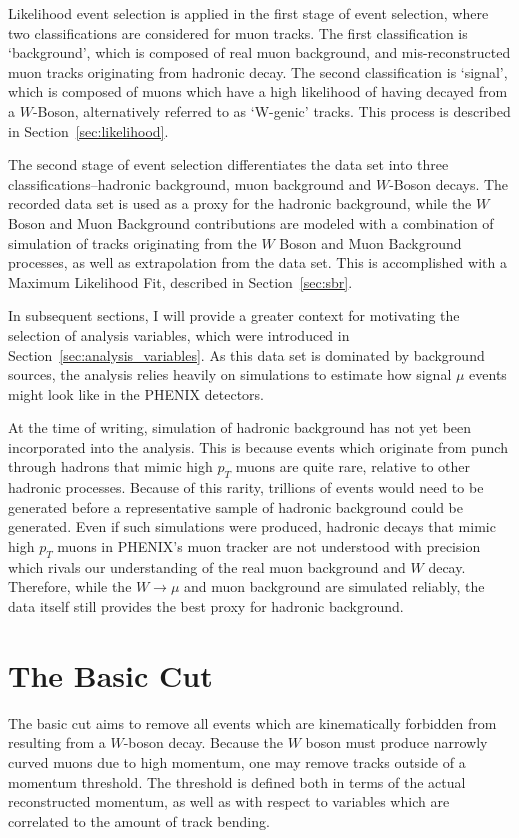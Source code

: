 Likelihood event selection is applied in the first stage of event selection,
where two classifications are considered for muon tracks. The first
classification is `background', which is composed of real muon background, and
mis-reconstructed muon tracks originating from hadronic decay. The second
classification is `signal', which is composed of muons which have a high
likelihood of having decayed from a $W$-Boson, alternatively referred to as
`W-genic' tracks. This process is described in Section~\ref{sec:likelihood}.

The second stage of event selection differentiates the data set into three
classifications--hadronic background, muon background and $W$-Boson decays.
The recorded data set is used as a proxy for the hadronic background, while the
$W$ Boson and Muon Background contributions are modeled with a combination of
simulation of tracks originating from the $W$ Boson and Muon Background
processes, as well as extrapolation from the data set. This is accomplished with
a Maximum Likelihood Fit, described in Section~\ref{sec:sbr}.

In subsequent sections, I will provide a greater context for motivating the
selection of analysis variables, which were introduced in
Section~\ref{sec:analysis_variables}. As this data set is dominated by
background sources, the analysis relies heavily on simulations to estimate how
signal $\mu$ events might look like in the PHENIX detectors.

At the time of writing, simulation of hadronic background has not yet been
incorporated into the analysis. This is because events which originate from
punch through hadrons that mimic high $p_T$ muons are quite rare, relative to
other hadronic processes.  Because of this rarity, trillions of events would
need to be generated before a representative sample of hadronic background could
be generated. Even if such simulations were produced, hadronic decays that mimic
high $p_T$ muons in PHENIX's muon tracker are not understood with precision
which rivals our understanding of the real muon background and $W$ decay.
Therefore, while the $W\rightarrow\mu$ and muon background are simulated
reliably, the data itself still provides the best proxy for hadronic background.

\clearpage
\section{The Basic Cut}
\label{sec:basic_cut}

The basic cut aims to remove all events which are kinematically forbidden from
resulting from a $W$-boson decay. Because the $W$ boson must produce narrowly
curved muons due to high momentum, one may remove tracks outside of a momentum
threshold. The threshold is defined both in terms of the actual reconstructed
momentum, as well as with respect to variables which are correlated to the
amount of track bending.

